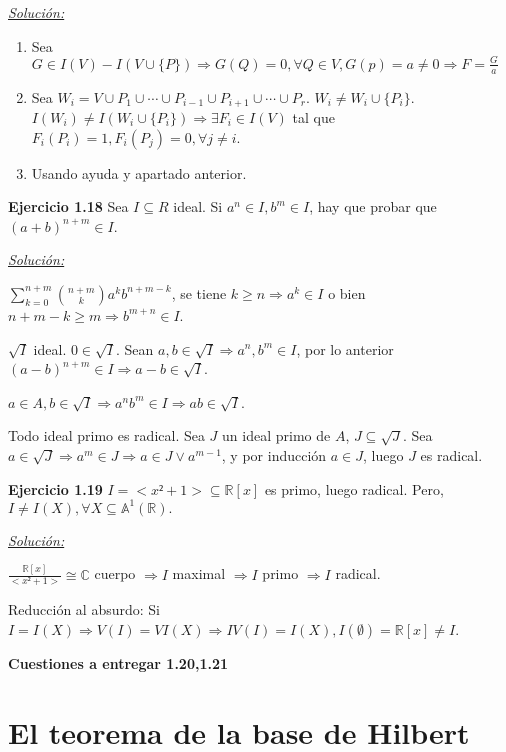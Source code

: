 \underline{\textit{Solución: }}

\begin{enumerate}
\item Sea $G\in I(V)-I(V\cup \{P \}) \Rightarrow G(Q) = 0, \forall Q \in V, G(p)=a \neq 0 \Rightarrow F = \frac{G}{a}$
\item Sea $W_i = V \cup P_1 \cup \cdots \cup P_{i-1}\cup P_{i+1}\cup \cdots  \cup P_r$. $W_i\neq W_i\cup \{ P_i \}$. $I(W_i)\neq I(W_i\cup \{P_i \}) \Rightarrow \exists F_i \in I(V) $ tal que $F_i(P_i)=1, F_i(P_j)=0, \forall j\neq i$.
\item Usando ayuda y apartado anterior.
\end{enumerate}

\textbf{Ejercicio 1.18 } Sea $I\subseteq R$ ideal. Si $a^n\in I, b^m \in I$, hay que probar que $(a+b)^{n+m}\in I$.

\underline{\textit{Solución: }}

$\sum_{k=0}^{n+m}  {n+m \choose k} a^kb^{n+m-k}$, se tiene $k\ge n \Rightarrow a^k \in I$ o bien $n+m -k \ge m \Rightarrow b^{m+n}\in I$.

$\sqrt{I}$ ideal. $0\in \sqrt{I}$. Sean $a,b\in \sqrt{I} \Rightarrow a^n,b^m \in I$, por lo anterior $(a-b)^{n+m}\in I \Rightarrow a-b\in \sqrt{I}$.

$a\in A,b\in \sqrt{I} \Rightarrow a^nb^m\in I \Rightarrow ab\in \sqrt{I}$.

Todo ideal primo es radical. Sea $J$ un ideal primo de $A$, $J\subseteq \sqrt{J}$. Sea $a\in \sqrt{J} \Rightarrow a^m\in J \Rightarrow a\in J \vee a^{m-1}$, y por inducción $a\in J$, luego $J$ es radical.

\textbf{Ejercicio 1.19 } $I=<x²+1> \subseteq \mathbb{R}[x]$ es primo, luego radical. Pero, $I\neq I(X), \forall X\subseteq \mathbb{A}^1(\mathbb{R}).$

\underline{\textit{Solución: }}

$\frac{\mathbb{R}[x]}{<x²+1>} \cong \mathbb{C}$ cuerpo $\Rightarrow I$ maximal $\Rightarrow I$ primo $\Rightarrow I$ radical.

Reducción al absurdo: Si $I=I(X) \Rightarrow V(I)=VI(X) \Rightarrow IV(I) = I(X), I(\emptyset) = \mathbb{R}[x] \neq I$.

\textbf{Cuestiones a entregar 1.20,1.21}

\section{El teorema de la base de Hilbert}

